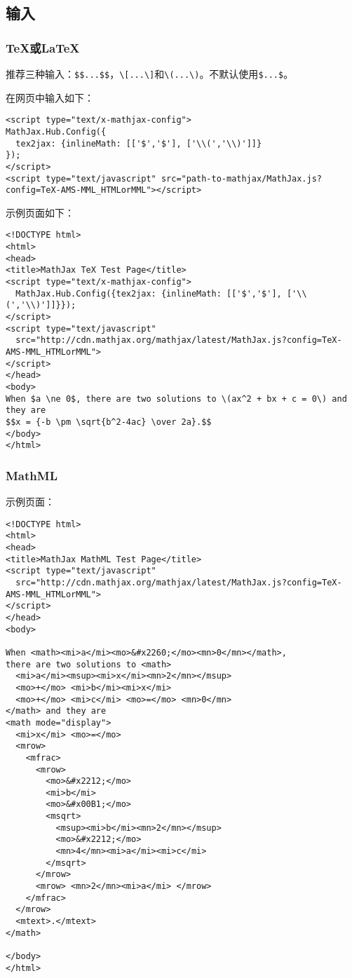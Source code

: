 \documentclass{article}
\begin{document}
\subsection{输入}
\subsubsection{\TeX 或\LaTeX}
推荐三种输入：\verb!$$...$$!，\verb!\[...\]!和\verb!\(...\)!。不默认使用\verb!$...$!。

在网页中输入如下：
\begin{verbatim}
<script type="text/x-mathjax-config">
MathJax.Hub.Config({
  tex2jax: {inlineMath: [['$','$'], ['\\(','\\)']]}
});
</script>
<script type="text/javascript" src="path-to-mathjax/MathJax.js?config=TeX-AMS-MML_HTMLorMML"></script>
\end{verbatim}

示例页面如下：
\begin{verbatim}
<!DOCTYPE html>
<html>
<head>
<title>MathJax TeX Test Page</title>
<script type="text/x-mathjax-config">
  MathJax.Hub.Config({tex2jax: {inlineMath: [['$','$'], ['\\(','\\)']]}});
</script>
<script type="text/javascript"
  src="http://cdn.mathjax.org/mathjax/latest/MathJax.js?config=TeX-AMS-MML_HTMLorMML">
</script>
</head>
<body>
When $a \ne 0$, there are two solutions to \(ax^2 + bx + c = 0\) and they are
$$x = {-b \pm \sqrt{b^2-4ac} \over 2a}.$$
</body>
</html>
\end{verbatim}
\subsubsection{MathML}
示例页面：
\begin{verbatim}
<!DOCTYPE html>
<html>
<head>
<title>MathJax MathML Test Page</title>
<script type="text/javascript"
  src="http://cdn.mathjax.org/mathjax/latest/MathJax.js?config=TeX-AMS-MML_HTMLorMML">
</script>
</head>
<body>

When <math><mi>a</mi><mo>&#x2260;</mo><mn>0</mn></math>,
there are two solutions to <math>
  <mi>a</mi><msup><mi>x</mi><mn>2</mn></msup>
  <mo>+</mo> <mi>b</mi><mi>x</mi>
  <mo>+</mo> <mi>c</mi> <mo>=</mo> <mn>0</mn>
</math> and they are
<math mode="display">
  <mi>x</mi> <mo>=</mo>
  <mrow>
    <mfrac>
      <mrow>
        <mo>&#x2212;</mo>
        <mi>b</mi>
        <mo>&#x00B1;</mo>
        <msqrt>
          <msup><mi>b</mi><mn>2</mn></msup>
          <mo>&#x2212;</mo>
          <mn>4</mn><mi>a</mi><mi>c</mi>
        </msqrt>
      </mrow>
      <mrow> <mn>2</mn><mi>a</mi> </mrow>
    </mfrac>
  </mrow>
  <mtext>.</mtext>
</math>

</body>
</html>
\end{verbatim}
\end{document}
